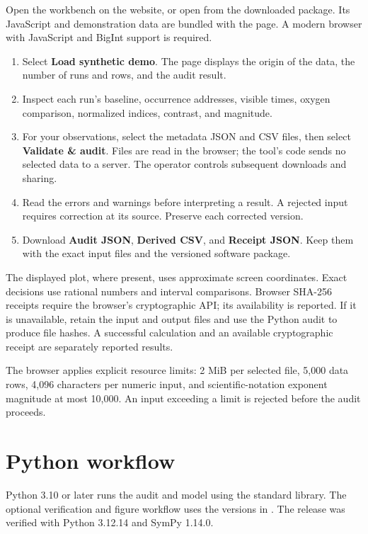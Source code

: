 \documentclass[11pt]{article}
\newcommand{\code}[1]{\texttt{\detokenize{#1}}}
\begin{document}
Open the workbench on the website, or open \code{web/index.html} from the
downloaded package. Its JavaScript and demonstration data are bundled with
the page. A modern browser with JavaScript and BigInt support is required.

\begin{enumerate}
\item Select \textbf{Load synthetic demo}. The page displays the origin of the data,
the number of runs and rows, and the audit result.
\item Inspect each run's baseline, occurrence addresses, visible times,
oxygen comparison, normalized indices, contrast, and magnitude.
\item For your observations, select the metadata JSON and CSV files, then
select \textbf{Validate \& audit}. Files are read in the browser; the tool's code sends no selected
data to a server. The operator controls subsequent downloads and sharing.
\item Read the errors and warnings before interpreting a result. A rejected
input requires correction at its source. Preserve each corrected version.
\item Download \textbf{Audit JSON}, \textbf{Derived CSV}, and \textbf{Receipt JSON}. Keep them with the
exact input files and the versioned software package.
\end{enumerate}

The displayed plot, where present, uses approximate screen coordinates.
Exact decisions use rational numbers and interval comparisons. Browser
SHA-256 receipts require the browser's cryptographic API; its availability
is reported. If it is unavailable, retain the input and output files and use
the Python audit to produce file hashes. A successful calculation and an
available cryptographic receipt are separately reported results.

The browser applies explicit resource limits: 2 MiB per selected file,
5,000 data rows, 4,096 characters per numeric input, and scientific-notation
exponent magnitude at most 10,000. An input exceeding a limit is rejected
before the audit proceeds.

\section{Python workflow}

Python 3.10 or later runs the audit and model using the standard library.
The optional verification and figure workflow uses the versions in
\code{requirements-optional.txt}. The release was verified with
Python 3.12.14 and SymPy 1.14.0.
\end{document}

